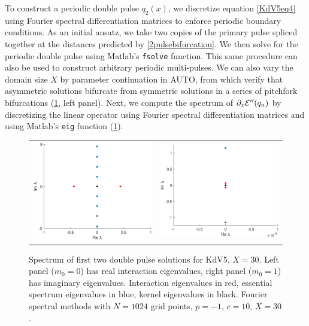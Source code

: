 \documentclass[10pt,reqno]{amsart}
\theoremstyle{plain}
\theoremstyle{definition}
\theoremstyle{remark}
\numberwithin{theorem}{section}
\numberwithin{equation}{section}
\begin{document}
To construct a periodic double pulse $q_2(x)$, we discretize equation \cref{KdV5eq4} using Fourier spectral differentiation matrices to enforce periodic boundary conditions. As an initial ansatz, we take two copies of the primary pulse spliced together at the distances predicted by \cref{2pulsebifurcation}. We then solve for the periodic double pulse using Matlab's \texttt{fsolve} function. This same procedure can also be used to construct arbitrary periodic multi-pulses. We can also vary the domain size $X$ by parameter continuation in AUTO, from which verify that asymmetric solutions bifurcate from symmetric solutions in a series of pitchfork bifurcations (\cref{fig:KdV5eigs1}, left panel). Next, we compute the spectrum of $\partial_x \mathcal{E}''(q_n)$ by discretizing the linear operator using Fourier spectral differentiation matrices and using Matlab's \texttt{eig} function (\cref{fig:KdV5eigs1}). 
\begin{figure}[H]
\begin{center}
\begin{tabular}{cc}
\includegraphics[width=7.5cm]{images/dp1spec.eps} &
\includegraphics[width=7.5cm]{images/dp2spec.eps}
\end{tabular}
\end{center}
\caption[Spectrum of double pulse solutions]{Spectrum of first two double pulse solutions for KdV5, $X = 30$. Left panel ($m_0 = 0$) has real interaction eigenvalues, right panel ($m_0 = 1$) has imaginary eigenvalues. Interaction eigenvalues in red, essential spectrum eigenvalues in blue, kernel eigenvalues in black. Fourier spectral methods with $N = 1024$ grid points, $p = -1$, $c = 10$, $X = 30$.}
\label{fig:KdV5eigs1}
\end{figure}
\end{document}
